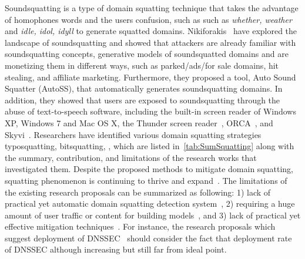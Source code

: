 Soundsquatting is a type of domain squatting technique that takes the advantage of homophones words and the users confusion, such as such as \textit{{whether,
weather}} and \textit{{idle, idol, idyll}} to generate squatted domains.  Nikiforakis\etal~ have explored the landscape of soundsquatting and showed that attackers are already familiar with soundsquatting concepts, \eg generative models of soundsquatted domains and are monetizing them in different ways, such as parked/ads/for sale domains, hit stealing, and affiliate marketing. Furthermore, they proposed a tool, Auto Sound Squatter (AutoSS), that automatically generates soundsquatting domains. In addition, they showed that users are exposed to soundsquatting through the abuse of text-to-speech software, including the built-in screen reader of Windows XP, Windows 7 and Mac OS X, the Thunder screen reader~, ORCA~, and Skyvi~. 
 Researchers have identified various domain squatting strategies \eg  typosquatting, bitsquatting, \etc, which are listed in~\autoref{tab:SumSquatting} along with the summary, contribution, and limitations of the research works that investigated them. Despite the proposed methods to mitigate domain squatting, squatting phenomenon is continuing to thrive and expand~. The limitations of the existing research proposals can be summarized as following: 1) lack of practical yet automatic domain squatting detection system~, 2) requiring a huge amount of user traffic or content for building models~, and 3) lack of practical yet effective mitigation techniques~. For instance, the research proposals which suggest deployment of DNSSEC~ should consider the fact that deployment rate of DNSSEC although increasing but still far from ideal point.

